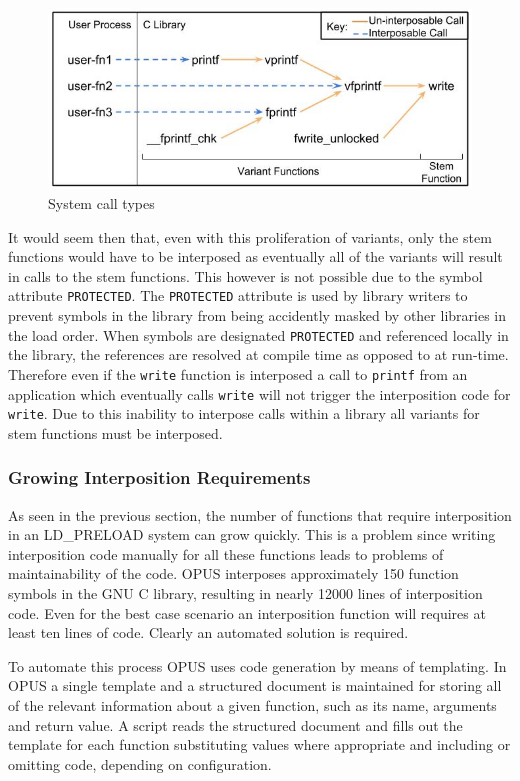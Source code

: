 \documentclass[withindex,glossary]{cam-thesis}
\begin{document}
\begin{figure}[t!]
  \centering
    \includegraphics[width=1.0\columnwidth]{funccalls}
  \caption{System call types}
  \label{fig:funcalls}
\end{figure}

It would seem then that, even with this proliferation of variants, only the stem functions would have to be interposed as eventually all of the variants will result in calls to the stem functions.
This however is not possible due to the symbol attribute \texttt{PROTECTED}.
The \texttt{PROTECTED} attribute is used by library writers to prevent symbols in the library from being accidently masked by other libraries in the load order.
When symbols are designated \texttt{PROTECTED} and referenced locally in the library, the references are resolved at compile time as opposed to at run-time.
Therefore even if the \texttt{write} function is interposed a call to \texttt{printf} from an application which eventually calls \texttt{write} will not trigger the interposition code for \texttt{write}.
Due to this inability to interpose calls within a library all variants for stem functions must be interposed.

\subsubsection{Growing Interposition Requirements}
As seen in the previous section, the number of functions that require interposition in an LD\_PRELOAD system can grow quickly.
This is a problem since writing interposition code manually for all these functions leads to problems of maintainability of the code.
OPUS interposes approximately 150 function symbols in the GNU C library, resulting in nearly 12000 lines of interposition code.
Even for the best case scenario an interposition function will requires at least ten lines of code.
Clearly an automated solution is required.

To automate this process OPUS uses code generation by means of templating.
In OPUS a single template and a structured document is maintained for storing all of the relevant information about a given function, such as its name, arguments and return value.
A script reads the structured document and fills out the template for each function substituting values where appropriate and including or omitting code, depending on configuration.
\end{document}
